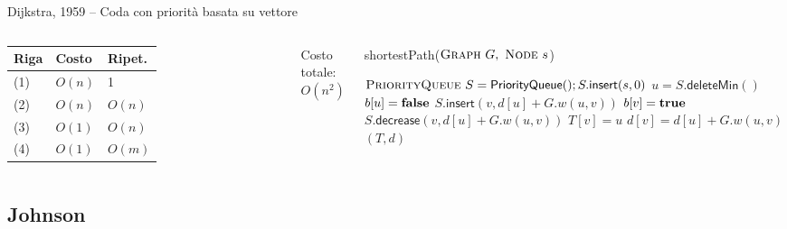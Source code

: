 \begin{frame}{Dijkstra, 1959 -- Coda con priorità basata su vettore}



\vspace{-9pt}
\begin{columns}

\begin{tabular}{|l|l|l|}
\hline
Riga & Costo & Ripet. \\\hline
(1) & $O(n)$ & 1 \\\hline
(2) & $O(n)$ & $O(n)$ \\\hline
(3) & $O(1)$ & $O(n)$ \\\hline
(4) & $O(1)$ & $O(m)$ \\\hline
\end{tabular}

\medskip
Costo totale: \alert{$O(n^2)$}

\vspace{-12pt}
\tiny
\begin{Procedure}
\caption[A]{\textsf{shortestPath}($\textsc{Graph}\ G,\ \textsc{Node}\ s$)}
\alert{$\textsc{PriorityQueue}\ S = \textsf{PriorityQueue}(); S.\textsf{insert}(s, 0)$}\;
{
  \alert{$u = S.\textsf{deleteMin}()$}\;
  $b[u] = \FALSE$\;
  {
    {
      {
        \alert{$S.\textsf{insert}(v, d[u]+G.w(u,v))$}\;
        $b[v] = \TRUE$\;
      }
      {
        \alert{$S.\textsf{decrease}(v, d[u]+G.w(u,v))$}
      }
      $T[v] = u$\;
      $d[v] = d[u] + G.w(u,v)$\;
    }
  }
}
\Return $(T,d)$
\end{Procedure}
\end{columns}



\end{frame}

\subsection{Johnson}

